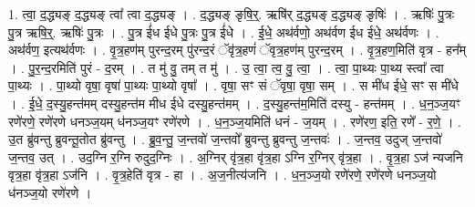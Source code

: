 \documentclass[17pt]{extarticle}
\begin{document}
1. त्वा॒ द॒द्ध्यङ् द॒द्ध्यङ् त्वा᳚ त्वा द॒द्ध्यङ् । . द॒द्ध्यङ् ङृषि॒र्॒. ऋषि॑र् द॒द्ध्यङ् द॒द्ध्यङ् ङृषिः॑ । . ऋषिः॑ पु॒त्रः पु॒त्र ऋषि॒र्॒. ऋषिः॑ पु॒त्रः । . पु॒त्र ई॑ध ईधे पु॒त्रः पु॒त्र ई॑धे । . ई॒धे॒ अथ॑र्वणो॒ अथ॑र्वण ईध ईधे॒ अथ॑र्वणः । . अथ॑र्वण॒ इत्यथ॑र्वणः । . वृ॒त्र॒हण॑म् पुरन्द॒रम् पु॑रन्द॒रं ॅवृ॑त्र॒हणं॑ ॅवृत्र॒हण॑म् पुरन्द॒रम् । . वृ॒त्र॒हण॒मिति॑ वृत्र - हन᳚म् । . पु॒र॒न्द॒रमिति॑ पुरं - द॒रम् । . त मु॑ वु॒ तम् त मु॑ । . उ॒ त्वा॒ त्व॒ वु॒ त्वा॒ । . त्वा॒ पा॒थ्यः पा॒थ्य स्त्वा᳚ त्वा पा॒थ्यः । . पा॒थ्यो वृषा॒ वृषा॑ पा॒थ्यः पा॒थ्यो वृषा᳚ । . वृषा॒ सꣳ सं ॅवृषा॒ वृषा॒ सम् । . स मी॑ध ईधे॒ सꣳ स मी॑धे । . ई॒धे॒ द॒स्यु॒हन्त॑मम् दस्यु॒हन्त॑म मीध ईधे दस्यु॒हन्त॑मम् । . द॒स्यु॒हन्त॑म॒मिति॑ दस्यु - हन्त॑मम् । . ध॒न॒ञ्ज॒यꣳ रणे॑रणे॒ रणे॑रणे धनञ्ज॒यम् ध॑नञ्ज॒यꣳ रणे॑रणे । . ध॒न॒ञ्ज॒यमिति॑ धनं - ज॒यम् । . रणे॑रण॒ इति॒ रणे᳚ - र॒णे॒ । . उ॒त ब्रु॑वन्तु ब्रुवन्तू॒तोत ब्रु॑वन्तु । . ब्रु॒व॒न्तु॒ ज॒न्तवो॑ ज॒न्तवो᳚ ब्रुवन्तु ब्रुवन्तु ज॒न्तवः॑ । . ज॒न्तव॒ उदुज् ज॒न्तवो॑ ज॒न्तव॒ उत् । . उद॒ग्नि र॒ग्नि रुदुद॒ग्निः । . अ॒ग्निर् वृ॑त्र॒हा वृ॑त्र॒हा ऽग्नि र॒ग्निर् वृ॑त्र॒हा । . वृ॒त्र॒हा ऽज॑ न्यजनि वृत्र॒हा वृ॑त्र॒हा ऽज॑नि । . वृ॒त्र॒हेति॑ वृत्र - हा । . अ॒ज॒नीत्य॑जनि । . ध॒न॒ञ्ज॒यो रणे॑रणे॒ रणे॑रणे धनञ्ज॒यो ध॑नञ्ज॒यो रणे॑रणे । \newline
\end{document}

